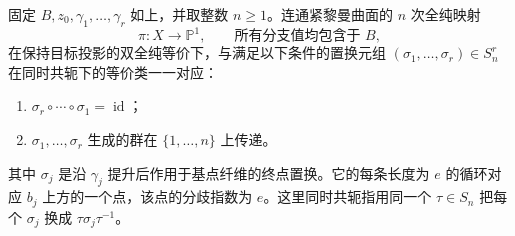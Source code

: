 \begin{theorem}\label{g4:thm:0204:monodromy-construction}
	固定 \(B,z_0,\gamma_1,\ldots,\gamma_r\) 如上，并取整数 \(n\ge1\)。连通紧黎曼曲面的 \(n\) 次全纯映射
	\[
		\pi:X\longrightarrow\mathbb P^1,
		\qquad \text{所有分支值均包含于 }B,
	\]
	在保持目标投影的双全纯等价下，与满足以下条件的置换元组 \((\sigma_1,\ldots,\sigma_r)\in S_n^r\) 在同时共轭下的等价类一一对应：
	\begin{enumerate}
		\item \(\sigma_r\circ\cdots\circ\sigma_1=\operatorname{id}\)；
		\item \(\sigma_1,\ldots,\sigma_r\) 生成的群在 \(\{1,\ldots,n\}\) 上传递。
	\end{enumerate}
	其中 \(\sigma_j\) 是沿 \(\gamma_j\) 提升后作用于基点纤维的终点置换。它的每条长度为 \(e\) 的循环对应 \(b_j\) 上方的一个点，该点的分歧指数为 \(e\)。这里同时共轭指用同一个 \(\tau\in S_n\) 把每个 \(\sigma_j\) 换成 \(\tau\sigma_j\tau^{-1}\)。
\end{theorem}
